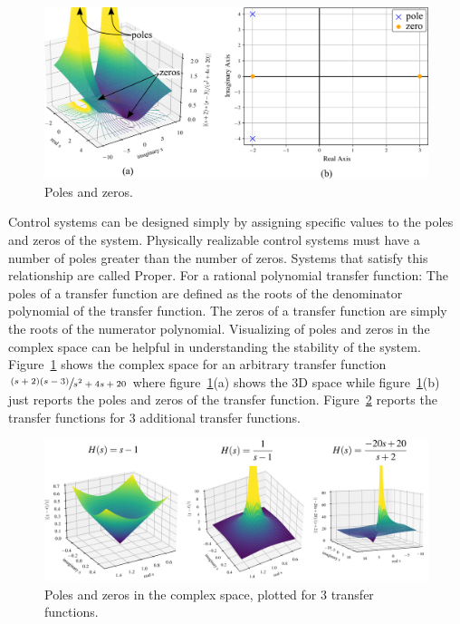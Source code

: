 \documentclass[12pt,letter]{article}
\numberwithin{ex}{section} %
\numberwithin{re}{section} %
\numberwithin{equation}{section}	%
\begin{document}
			\begin{figure}[H]
				\centering
				\includegraphics[width=5.0in]{../figures/transfer_function_poles_and_zeros_and_3D_space.png}
				\caption{Poles and zeros.}
				\label{fig:transfer_function_poles_and_zeros_and_3D_space}
			\end{figure}

	Control systems can be designed simply by assigning specific values to the poles and zeros of the system. Physically realizable control systems must have a number of poles greater than the number of zeros. Systems that satisfy this relationship are called Proper. For a rational polynomial transfer function: The poles of a transfer function are defined as the roots of the denominator polynomial of the transfer function.  The zeros of a transfer function are simply the roots of the numerator polynomial. Visualizing of poles and zeros in the complex space can be helpful in understanding the stability of the system. Figure~\ref{fig:transfer_function_poles_and_zeros_and_3D_space} shows the complex space for an arbitrary transfer function $\sfrac{(s+2)(s-3)}{s^2+4s+20}$ where figure~\ref{fig:transfer_function_poles_and_zeros_and_3D_space}(a) shows the 3D space while figure~\ref{fig:transfer_function_poles_and_zeros_and_3D_space}(b) just reports the poles and zeros of the transfer function.  Figure~\ref{fig:transfer_function_3D_space_3_examples} reports the transfer functions for 3 additional transfer functions.  

			\begin{figure}[H]
				\centering
				\includegraphics[width=6.5in]{../figures/transfer_function_3D_space_3_examples.png}
				\caption{Poles and zeros in the complex space, plotted for 3 transfer functions.}
				\label{fig:transfer_function_3D_space_3_examples}
			\end{figure}
\end{document}

